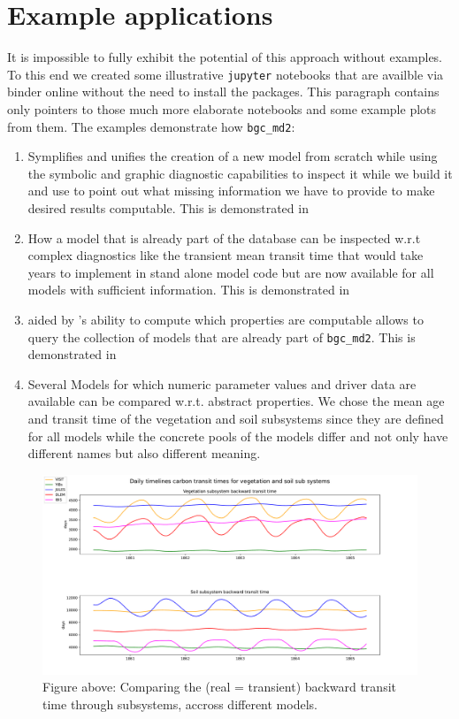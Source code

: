 \section{Example applications}  
It is impossible to fully exhibit the potential of this approach without
examples.
To this end we created some illustrative \texttt{jupyter} notebooks that are
availble via binder online without the need to install the packages. 
This paragraph contains only pointers to those much more elaborate notebooks
and some example plots from them.
The examples demonstrate how \texttt{bgc_md2}:
\begin{enumerate}
\item 
  Symplifies and unifies the creation of a new model from scratch while using the
  symbolic and graphic diagnostic capabilities to inspect it while we build it
  and use 
  \ComputabilityGraphs to point out what missing information we have to
  provide to make desired results computable.
  This is demonstrated in
\item 
  How a model that is already part of the database can be
  inspected w.r.t complex diagnostics like the transient mean transit time that
  would take years to implement in stand alone model code but are now available
  for all models with sufficient information.
  This is demonstrated in
\item 
  aided by \ComputabilityGraphs 's ability to compute which properties are computable
  allows to query the collection of models that are already part of
  \texttt{bgc\_md2}.
  This is demonstrated in
\item 
  Several Models for which numeric parameter values and driver data are
  available can be compared w.r.t. abstract properties.
  We chose the mean age and transit time of the vegetation and soil subsystems
  since they are defined for all models while the concrete pools of the models
  differ and not only have different names but also different meaning.
\end{enumerate}

\begin{figure}[t]
	\includegraphics[width=\columnwidth]{test_veg_soil.pdf}
  \caption{
  Figure above: Comparing the (real = transient) backward transit time through 
  subsystems, accross different models. 
  }
\end{figure}  

